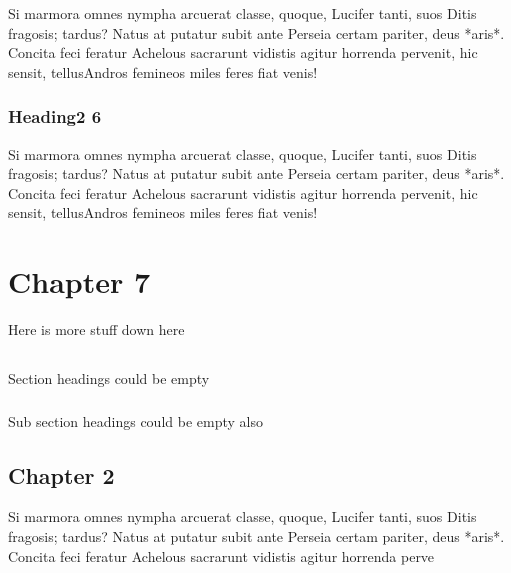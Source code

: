 Si marmora omnes nympha arcuerat classe, quoque, Lucifer tanti, suos Ditis
fragosis; tardus? Natus at putatur subit ante Perseia certam pariter, deus
*aris*. Concita feci feratur Achelous sacrarunt vidistis agitur horrenda
pervenit, hic sensit, tellusAndros femineos miles feres fiat venis!

\subsection{Heading2 6}

Si marmora omnes nympha arcuerat classe, quoque, Lucifer tanti, suos Ditis
fragosis; tardus? Natus at putatur subit ante Perseia certam pariter, deus
*aris*. Concita feci feratur Achelous sacrarunt vidistis agitur horrenda
pervenit, hic sensit, tellusAndros femineos miles feres fiat venis!

\chapter{Chapter 7}

Here is more stuff down here


\section{}

Section headings could be empty

\subsection{}

Sub section headings could be empty also


\section{Chapter 2}

Si marmora omnes nympha arcuerat classe, quoque, Lucifer tanti, suos Ditis
fragosis; tardus? Natus at putatur subit ante Perseia certam pariter, deus
*aris*. Concita feci feratur Achelous sacrarunt vidistis agitur horrenda
perve
